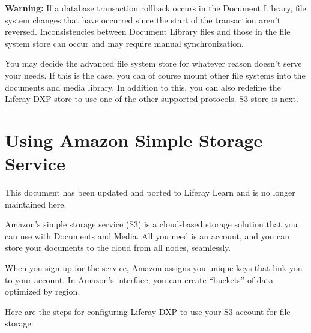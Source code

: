 \textbf{Warning:} If a database transaction rollback occurs in the
Document Library, file system changes that have occurred since the start
of the transaction aren't reversed. Inconsistencies between Document
Library files and those in the file system store can occur and may
require manual synchronization.

\noindent\hrulefill

You may decide the advanced file system store for whatever reason
doesn't serve your needs. If this is the case, you can of course mount
other file systems into the documents and media library. In addition to
this, you can also redefine the Liferay DXP store to use one of the
other supported protocols. S3 store is next.

\chapter{Using Amazon Simple Storage
Service}\label{using-amazon-simple-storage-service}

{This document has been updated and ported to Liferay Learn and is no
longer maintained here.}

Amazon's simple storage service (S3) is a cloud-based storage solution
that you can use with Documents and Media. All you need is an account,
and you can store your documents to the cloud from all nodes,
seamlessly.

When you sign up for the service, Amazon assigns you unique keys that
link you to your account. In Amazon's interface, you can create
``buckets'' of data optimized by region.

Here are the steps for configuring Liferay DXP to use your S3 account
for file storage:

